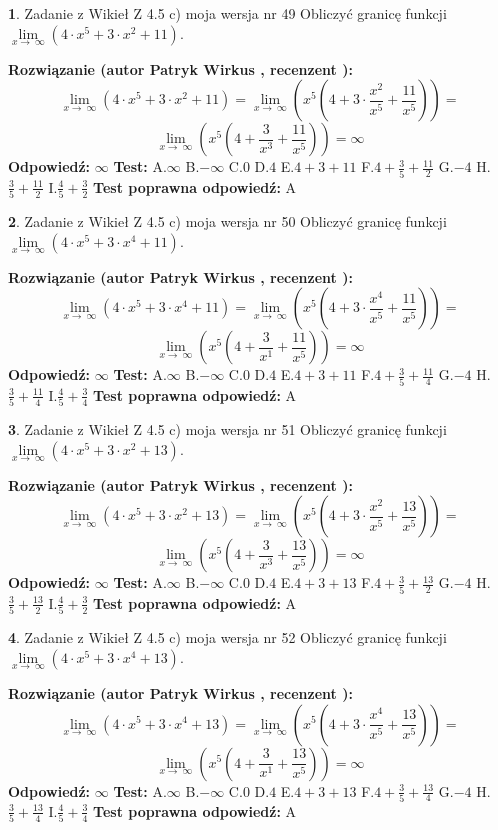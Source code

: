 \documentclass[12pt, a4paper]{article}
\theoremstyle{definition} %
\newtheorem{zad}{}
\newcommand{\zadStart}[1]{\begin{zad}#1\newline}
\newcommand{\zadStop}{\end{zad}}
\newcommand{\rozwStart}[2]{\noindent \textbf{Rozwiązanie (autor #1 , recenzent #2): }\newline}
\newcommand{\rozwStop}{\newline}
\newcommand{\odpStart}{\noindent \textbf{Odpowiedź:}\newline}
\newcommand{\odpStop}{\newline}
\newcommand{\testStart}{\noindent \textbf{Test:}\newline}
\newcommand{\testStop}{\newline}
\newcommand{\kluczStart}{\noindent \textbf{Test poprawna odpowiedź:}\newline}
\newcommand{\kluczStop}{\newline}
\begin{document}
\zadStart{Zadanie z Wikieł Z 4.5 c) moja wersja nr 49}
Obliczyć granicę funkcji  $\lim\limits_{x\to\ \infty}(4 \cdot x^{5}+3 \cdot x^{2}+11)$.
\zadStop
\rozwStart{Patryk Wirkus}{}
$$\lim\limits_{x\to\ \infty}(4 \cdot x^{5}+3 \cdot x^{2}+11) = \lim\limits_{x\to\ \infty}(x^{5}(4 +3 \cdot \frac{x^{2}}{x^{5}}+\frac{11}{x^{5}})) =$$ $$\lim\limits_{x\to\ \infty}(x^{5}(4 +\frac{3}{x^{3}}+\frac{11}{x^{5}})) =\infty$$
\rozwStop
\odpStart
$\infty$
\odpStop
\testStart
A.$\infty$ B.$-\infty$ C.$0$ D.$4$ E.$4 + 3 + 11$
F.$4+\frac{3}{5}+\frac{11}{2}$ G.$-4$
H.$\frac{3}{5}+\frac{11}{2}$
I.$\frac{4}{5}+\frac{3}{2}$
\testStop
\kluczStart
A
\kluczStop



\zadStart{Zadanie z Wikieł Z 4.5 c) moja wersja nr 50}
Obliczyć granicę funkcji  $\lim\limits_{x\to\ \infty}(4 \cdot x^{5}+3 \cdot x^{4}+11)$.
\zadStop
\rozwStart{Patryk Wirkus}{}
$$\lim\limits_{x\to\ \infty}(4 \cdot x^{5}+3 \cdot x^{4}+11) = \lim\limits_{x\to\ \infty}(x^{5}(4 +3 \cdot \frac{x^{4}}{x^{5}}+\frac{11}{x^{5}})) =$$ $$\lim\limits_{x\to\ \infty}(x^{5}(4 +\frac{3}{x^{1}}+\frac{11}{x^{5}})) =\infty$$
\rozwStop
\odpStart
$\infty$
\odpStop
\testStart
A.$\infty$ B.$-\infty$ C.$0$ D.$4$ E.$4 + 3 + 11$
F.$4+\frac{3}{5}+\frac{11}{4}$ G.$-4$
H.$\frac{3}{5}+\frac{11}{4}$
I.$\frac{4}{5}+\frac{3}{4}$
\testStop
\kluczStart
A
\kluczStop



\zadStart{Zadanie z Wikieł Z 4.5 c) moja wersja nr 51}
Obliczyć granicę funkcji  $\lim\limits_{x\to\ \infty}(4 \cdot x^{5}+3 \cdot x^{2}+13)$.
\zadStop
\rozwStart{Patryk Wirkus}{}
$$\lim\limits_{x\to\ \infty}(4 \cdot x^{5}+3 \cdot x^{2}+13) = \lim\limits_{x\to\ \infty}(x^{5}(4 +3 \cdot \frac{x^{2}}{x^{5}}+\frac{13}{x^{5}})) =$$ $$\lim\limits_{x\to\ \infty}(x^{5}(4 +\frac{3}{x^{3}}+\frac{13}{x^{5}})) =\infty$$
\rozwStop
\odpStart
$\infty$
\odpStop
\testStart
A.$\infty$ B.$-\infty$ C.$0$ D.$4$ E.$4 + 3 + 13$
F.$4+\frac{3}{5}+\frac{13}{2}$ G.$-4$
H.$\frac{3}{5}+\frac{13}{2}$
I.$\frac{4}{5}+\frac{3}{2}$
\testStop
\kluczStart
A
\kluczStop



\zadStart{Zadanie z Wikieł Z 4.5 c) moja wersja nr 52}
Obliczyć granicę funkcji  $\lim\limits_{x\to\ \infty}(4 \cdot x^{5}+3 \cdot x^{4}+13)$.
\zadStop
\rozwStart{Patryk Wirkus}{}
$$\lim\limits_{x\to\ \infty}(4 \cdot x^{5}+3 \cdot x^{4}+13) = \lim\limits_{x\to\ \infty}(x^{5}(4 +3 \cdot \frac{x^{4}}{x^{5}}+\frac{13}{x^{5}})) =$$ $$\lim\limits_{x\to\ \infty}(x^{5}(4 +\frac{3}{x^{1}}+\frac{13}{x^{5}})) =\infty$$
\rozwStop
\odpStart
$\infty$
\odpStop
\testStart
A.$\infty$ B.$-\infty$ C.$0$ D.$4$ E.$4 + 3 + 13$
F.$4+\frac{3}{5}+\frac{13}{4}$ G.$-4$
H.$\frac{3}{5}+\frac{13}{4}$
I.$\frac{4}{5}+\frac{3}{4}$
\testStop
\kluczStart
A
\kluczStop
\end{document}
